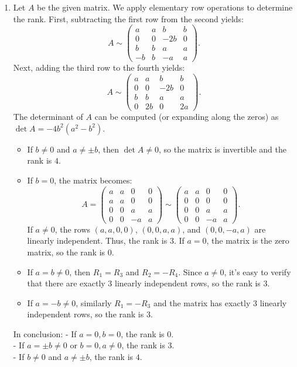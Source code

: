 \documentclass{article}
\begin{document}
\begin{enumerate}[label=\fbox{\arabic*}]
  \item %
        Let $A$ be the given matrix. We apply elementary row operations to determine the rank.
        First, subtracting the first row from the second yields:
        \[
          A \sim \begin{pmatrix} a & a & b & b \\ 0 & 0 & -2b & 0 \\ b & b & a & a \\ -b & b & -a & a \end{pmatrix}.
        \]
        Next, adding the third row to the fourth yields:
        \[
          A \sim \begin{pmatrix} a & a & b & b \\ 0 & 0 & -2b & 0 \\ b & b & a & a \\ 0 & 2b & 0 & 2a \end{pmatrix}.
        \]
        The determinant of $A$ can be computed (or expanding along the zeros) as $\det A = -4b^2(a^2 - b^2)$.
        \begin{itemize}
          \item If $b \neq 0$ and $a \neq \pm b$, then $\det A \neq 0$, so the matrix is invertible and the rank is $4$.
          \item If $b = 0$, the matrix becomes:
                \[
                  A = \begin{pmatrix} a & a & 0 & 0 \\ a & a & 0 & 0 \\ 0 & 0 & a & a \\ 0 & 0 & -a & a \end{pmatrix} \sim \begin{pmatrix} a & a & 0 & 0 \\ 0 & 0 & 0 & 0 \\ 0 & 0 & a & a \\ 0 & 0 & -a & a \end{pmatrix}.
                \]
                If $a \neq 0$, the rows $(a, a, 0, 0)$, $(0, 0, a, a)$, and $(0, 0, -a, a)$ are linearly independent. Thus, the rank is $3$. If $a = 0$, the matrix is the zero matrix, so the rank is $0$.
          \item If $a = b \neq 0$, then $R_1 = R_3$ and $R_2 = -R_4$. Since $a \neq 0$, it's easy to verify that there are exactly 3 linearly independent rows, so the rank is $3$.
          \item If $a = -b \neq 0$, similarly $R_1 = -R_3$ and the matrix has exactly 3 linearly independent rows, so the rank is $3$.
        \end{itemize}
        In conclusion:
        - If $a = 0, b = 0$, the rank is $0$. \\
        - If $a = \pm b \neq 0$ or $b = 0, a \neq 0$, the rank is $3$. \\
        - If $b \neq 0$ and $a \neq \pm b$, the rank is $4$.


\end{enumerate}
\end{document}
